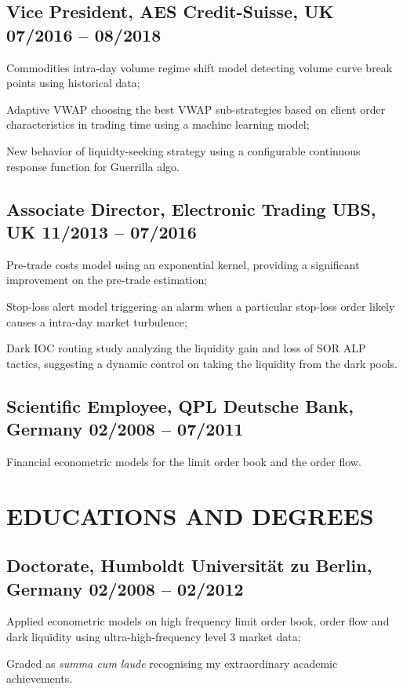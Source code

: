 \documentclass[a4paper,10pt]{article}
\begin{document}
\subsection{Vice President, AES Credit-Suisse, UK \hfill 07/2016 -- 08/2018}
\begin{idesc}
\item[Commodities intra-day volume regime shift model] detecting volume curve break points using historical data;   
\item[Adaptive VWAP] choosing the best VWAP sub-strategies based on client order characteristics in trading time using a machine learning model;
\item[New behavior of liquidty-seeking strategy] using a configurable continuous response function for Guerrilla algo.
\end{idesc}
\subsection{Associate Director,  Electronic Trading UBS, UK \hfill 11/2013 -- 07/2016} 
\begin{idesc}
\item[Pre-trade costs model] using an exponential kernel, providing a significant improvement on the pre-trade estimation;  
\item[Stop-loss alert model] triggering an alarm when a particular stop-loss order likely causes a intra-day market turbulence;  
\item[Dark IOC routing study] analyzing the liquidity gain and loss of SOR ALP tactics, suggesting a dynamic control on taking the liquidity from the dark pools. 
\end{idesc}
\subsection{Scientific Employee,  QPL Deutsche Bank, Germany \hfill 02/2008 -- 07/2011} 
\begin{idesc}
\item[Financial econometric models] for the limit order book and the order flow.
\end{idesc}

\section{EDUCATIONS AND DEGREES}
\subsection{Doctorate, Humboldt Universit\"at zu Berlin, Germany \hfill 02/2008 -- 02/2012}
\begin{idesc}
\item[Applied econometric models] on high frequency limit order book, order flow and dark liquidity using ultra-high-frequency level 3 market data;
\item[Graded as \emph{summa cum laude}] recognising my extraordinary academic achievements.
\end{idesc}
\end{document}
